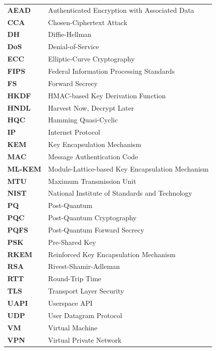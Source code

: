\begin{tabular}{ll}
\textbf{AEAD}   & Authenticated Encryption with Associated Data \\
\textbf{CCA}    & Chosen-Ciphertext Attack \\
\textbf{DH}     & Diffie-Hellman \\
\textbf{DoS}    & Denial-of-Service \\
\textbf{ECC}    & Elliptic-Curve Cryptography \\
\textbf{FIPS}   & Federal Information Processing Standards \\
\textbf{FS}     & Forward Secrecy \\
\textbf{HKDF}   & HMAC-based Key Derivation Function \\
\textbf{HNDL}   & Harvest Now, Decrypt Later \\
\textbf{HQC}    & Hamming Quasi-Cyclic \\
\textbf{IP}     & Internet Protocol \\
\textbf{KEM}    & Key Encapsulation Mechanism \\
\textbf{MAC}    & Message Authentication Code \\
\textbf{ML-KEM} & Module-Lattice-based Key Encapsulation Mechanism \\
\textbf{MTU}    & Maximum Transmission Unit \\
\textbf{NIST}   & National Institute of Standards and Technology \\
\textbf{PQ}     & Post-Quantum \\
\textbf{PQC}    & Post-Quantum Cryptography \\
\textbf{PQFS}   & Post-Quantum Forward Secrecy \\
\textbf{PSK}    & Pre-Shared Key \\
\textbf{RKEM}   & Reinforced Key Encapsulation Mechanism \\
\textbf{RSA}    & Rivest-Shamir-Adleman \\
\textbf{RTT}    & Round-Trip Time \\
\textbf{TLS}    & Transport Layer Security \\
\textbf{UAPI}   & Userspace API \\
\textbf{UDP}    & User Datagram Protocol \\
\textbf{VM}     & Virtual Machine \\
\textbf{VPN}    & Virtual Private Network \\
\end{tabular}